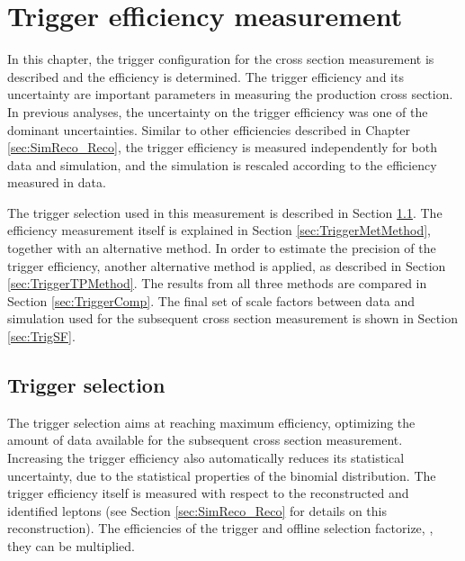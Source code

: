 
\chapter{Trigger efficiency measurement}
\label{sec:Trigger}

In this chapter, the trigger configuration for the \ttbar cross section measurement is described and the efficiency is determined.
The trigger efficiency and its uncertainty are important parameters in measuring the \ttbar
production cross section. In previous analyses, the uncertainty on the trigger efficiency was one of the dominant uncertainties.
Similar to other efficiencies described in Chapter \ref{sec:SimReco_Reco}, the trigger efficiency
is measured independently for both data and simulation, and the simulation is rescaled according to the efficiency measured in data.

The trigger selection used in this measurement 
is described in  Section \ref{sec:TriggerSel}. 
The efficiency measurement itself is explained in Section \ref{sec:TriggerMetMethod}, together with an alternative method. In order to estimate the precision of the trigger efficiency, another alternative method is applied,
as described in Section \ref{sec:TriggerTPMethod}. The results from all three methods are compared in Section \ref{sec:TriggerComp}.
The final set of scale factors between data and simulation used for the subsequent \ttbar cross section measurement is shown in Section \ref{sec:TrigSF}. 



\section{Trigger selection} %
\label{sec:TriggerSel}

The trigger selection aims at reaching maximum efficiency, optimizing the amount of data available for the subsequent \ttbar cross section measurement. 
Increasing the trigger efficiency also automatically reduces its statistical uncertainty, due to the statistical properties of the binomial distribution.
The trigger efficiency itself is measured with respect to the reconstructed and identified leptons (see Section \ref{sec:SimReco_Reco} for details
on this reconstruction). The efficiencies of the trigger and offline selection factorize, \ie, they can be multiplied.

